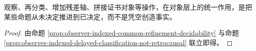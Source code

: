 \begin{corollary}[观察更新的对象层意义]\label{cor:observer-indexed-update-decides-not-create}
观察、再分类、增加残差轴、拼接证书对象等操作，在对象层上的统一作用，是把某些命题从未决定推进到已决定，而不是凭空创造事实。
\end{corollary}

\begin{proof}
由命题 \ref{prop:observer-indexed-common-refinement-decidability} 与命题 \ref{prop:observer-indexed-delayed-classification-not-retrocausal} 联立即得。
\end{proof}


